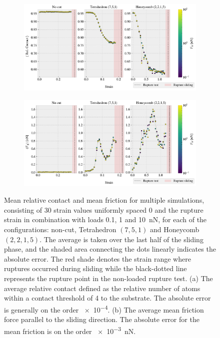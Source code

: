\begin{figure}[H]
  \centering
  \begin{subfigure}[t]{\textwidth}
      \centering
      \includegraphics[width=\textwidth]{figures/baseline/multi_stretch_area_compare.pdf}
      \caption{}
      \label{fig:fig:multi_stretch_contact}
  \end{subfigure}
  \hfill
  \begin{subfigure}[t]{\textwidth}
      \centering
      \includegraphics[width=\textwidth]{figures/baseline/multi_stretch_mean_compare.pdf}
      \caption{}
      \label{fig:multi_stretch_mean_fric}
  \end{subfigure}
  \hfill
     \caption{Mean relative contact and mean friction for multiple simulations,
     consisting of 30 strain values uniformly spaced 0 and the rupture strain in combination with loads 0.1, 1 and
     \SI{10}{nN}, for each of the configurations: non-cut, Tetrahedron $(7,5,1)$
     and Honeycomb $(2,2,1,5)$. The average is taken over the last half of the
     sliding phase, and the shaded area connecting the dots linearly indicates
     the absolute error. The red shade denotes the strain range where ruptures
     occurred during sliding while the black-dotted line represents the rupture
     point in the non-loaded rupture test. (a) The average relative contact
     defined as the relative number of atoms within a contact threshold of
     \SI{4}{} to the substrate. The absolute error is generally on the
     order \num{e-4}. (b) The average mean friction force parallel to the
     sliding direction. The absolute error for the mean friction is on the order
     \SI{e-3}{nN}.}
     \label{fig:multi_stretch}
\end{figure}

